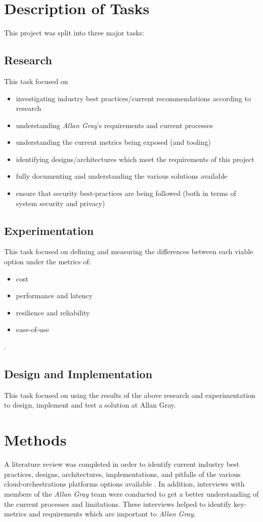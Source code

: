 \section{Description of Tasks}
This project was split into three major tasks:
\subsection{Research}
This task focused on
\begin{itemize}
  \item investigating industry best practices/current recommendations according to research
  \item understanding \textit{Allan Gray}'s requirements and current processes
  \item understanding the current metrics being exposed (and tooling)
  \item identifying designs/architectures which meet the requirements of this project
  \item fully documenting and understanding the various solutions available
  \item ensure that security best-practices are being followed (both in terms of system security and privacy)
\end{itemize}
\subsection{Experimentation}
This task focused on defining and measuring the differences between each viable option under the metrics of:
\begin{itemize}
  \item cost
  \item performance and latency
  \item resilience and reliability
  \item ease-of-use
\end{itemize}.
\subsection{Design and Implementation}
This task focused on using the results of the above research and experimentation to design, implement and test a solution at Allan Gray.

\section{Methods}
A literature review was completed in order to identify current industry best practices, designs, architectures, implementations, and
pitfalls of the various cloud-orchestrations platforms options available .
In addition, interviews with members of the \textit{Allan Gray} team were conducted to get a better understanding of the current processes and limitations.
These interviews helped to identify key-metrics and requirements which are important to \textit{Allan Gray}. \\

